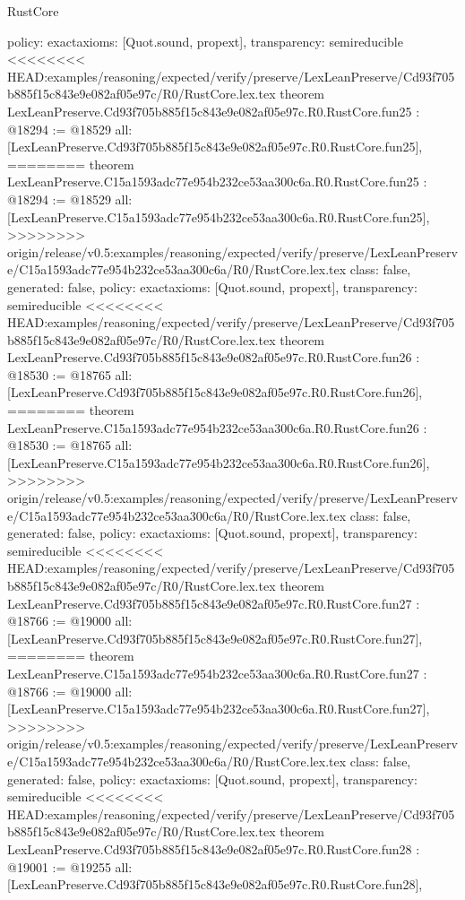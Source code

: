 \begin{lexlean}{RustCore}
\begin{coremodule}
{\begin{coremodule}
{{{{{{{{{{{{{{{{{{{{{{{{{{{{  policy: exact{axioms: [Quot.sound, propext]},
  transparency: semireducible
}
<<<<<<<< HEAD:examples/reasoning/expected/verify/preserve/LexLeanPreserve/Cd93f705b885f15c843e9e082af05e97c/R0/RustCore.lex.tex
theorem LexLeanPreserve.Cd93f705b885f15c843e9e082af05e97c.R0.RustCore.fun25 : @18294 := @18529 {
  all: [LexLeanPreserve.Cd93f705b885f15c843e9e082af05e97c.R0.RustCore.fun25],
========
theorem LexLeanPreserve.C15a1593adc77e954b232ce53aa300c6a.R0.RustCore.fun25 : @18294 := @18529 {
  all: [LexLeanPreserve.C15a1593adc77e954b232ce53aa300c6a.R0.RustCore.fun25],
>>>>>>>> origin/release/v0.5:examples/reasoning/expected/verify/preserve/LexLeanPreserve/C15a1593adc77e954b232ce53aa300c6a/R0/RustCore.lex.tex
  class: false,
  generated: false,
  policy: exact{axioms: [Quot.sound, propext]},
  transparency: semireducible
}
<<<<<<<< HEAD:examples/reasoning/expected/verify/preserve/LexLeanPreserve/Cd93f705b885f15c843e9e082af05e97c/R0/RustCore.lex.tex
theorem LexLeanPreserve.Cd93f705b885f15c843e9e082af05e97c.R0.RustCore.fun26 : @18530 := @18765 {
  all: [LexLeanPreserve.Cd93f705b885f15c843e9e082af05e97c.R0.RustCore.fun26],
========
theorem LexLeanPreserve.C15a1593adc77e954b232ce53aa300c6a.R0.RustCore.fun26 : @18530 := @18765 {
  all: [LexLeanPreserve.C15a1593adc77e954b232ce53aa300c6a.R0.RustCore.fun26],
>>>>>>>> origin/release/v0.5:examples/reasoning/expected/verify/preserve/LexLeanPreserve/C15a1593adc77e954b232ce53aa300c6a/R0/RustCore.lex.tex
  class: false,
  generated: false,
  policy: exact{axioms: [Quot.sound, propext]},
  transparency: semireducible
}
<<<<<<<< HEAD:examples/reasoning/expected/verify/preserve/LexLeanPreserve/Cd93f705b885f15c843e9e082af05e97c/R0/RustCore.lex.tex
theorem LexLeanPreserve.Cd93f705b885f15c843e9e082af05e97c.R0.RustCore.fun27 : @18766 := @19000 {
  all: [LexLeanPreserve.Cd93f705b885f15c843e9e082af05e97c.R0.RustCore.fun27],
========
theorem LexLeanPreserve.C15a1593adc77e954b232ce53aa300c6a.R0.RustCore.fun27 : @18766 := @19000 {
  all: [LexLeanPreserve.C15a1593adc77e954b232ce53aa300c6a.R0.RustCore.fun27],
>>>>>>>> origin/release/v0.5:examples/reasoning/expected/verify/preserve/LexLeanPreserve/C15a1593adc77e954b232ce53aa300c6a/R0/RustCore.lex.tex
  class: false,
  generated: false,
  policy: exact{axioms: [Quot.sound, propext]},
  transparency: semireducible
}
<<<<<<<< HEAD:examples/reasoning/expected/verify/preserve/LexLeanPreserve/Cd93f705b885f15c843e9e082af05e97c/R0/RustCore.lex.tex
theorem LexLeanPreserve.Cd93f705b885f15c843e9e082af05e97c.R0.RustCore.fun28 : @19001 := @19255 {
  all: [LexLeanPreserve.Cd93f705b885f15c843e9e082af05e97c.R0.RustCore.fun28],
}}}}}}}}}}}}}}}}}}}}}}}}}}}}}}}
\end{coremodule}}
\end{coremodule}
\end{lexlean}
